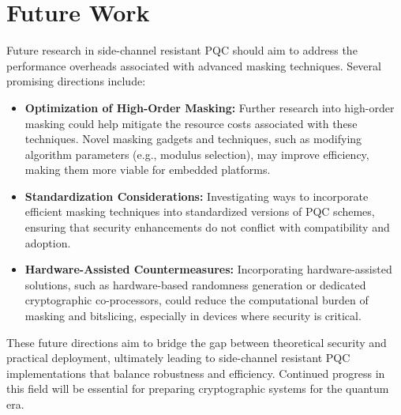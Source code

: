 \section{Future Work}

Future research in side-channel resistant \ac{PQC} should aim to address the performance overheads associated with advanced masking techniques. Several promising directions include:

\begin{itemize}
    \item \textbf{Optimization of High-Order Masking:} Further research into high-order masking could help mitigate the resource costs associated with these techniques. Novel masking gadgets and techniques, such as modifying algorithm parameters (e.g., modulus selection), may improve efficiency, making them more viable for embedded platforms.
    \item \textbf{Standardization Considerations:} Investigating ways to incorporate efficient masking techniques into standardized versions of \ac{PQC} schemes, ensuring that security enhancements do not conflict with compatibility and adoption.
    \item \textbf{Hardware-Assisted Countermeasures:} Incorporating hardware-assisted solutions, such as hardware-based randomness generation or dedicated cryptographic co-processors, could reduce the computational burden of masking and bitslicing, especially in devices where security is critical.
\end{itemize}

These future directions aim to bridge the gap between theoretical security and practical deployment, ultimately leading to side-channel resistant \ac{PQC} implementations that balance robustness and efficiency. Continued progress in this field will be essential for preparing cryptographic systems for the quantum era.

